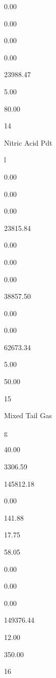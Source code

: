 \documentclass[a4paper,portrait,12pt]{article}
\begin{document}
0.00


0.00


0.00


0.00


23988.47


5.00


80.00





14


\begin{flushleft}
Nitric Acid Pdt
\end{flushleft}


\begin{flushleft}
l
\end{flushleft}


0.00


0.00


0.00


23815.84


0.00


0.00


0.00


38857.50


0.00


0.00


62673.34


5.00


50.00





15


\begin{flushleft}
Mixed Tail Gas
\end{flushleft}


\begin{flushleft}
g
\end{flushleft}


40.00


3306.59


145812.18


0.00


141.88


17.75


58.05


0.00


0.00


0.00


149376.44


12.00


350.00





16
\end{document}
